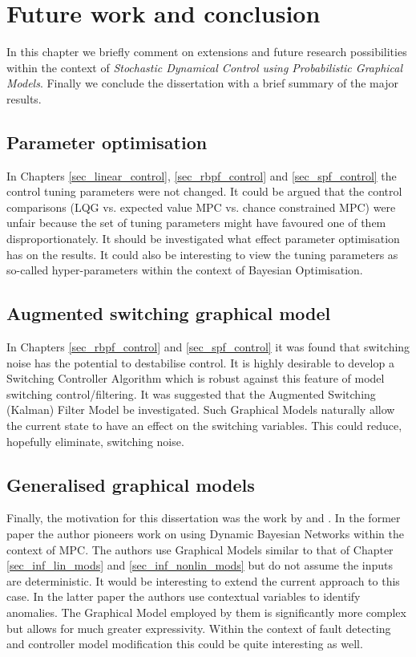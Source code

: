 \chapter{Future work and conclusion}
In this chapter we briefly comment on extensions and future research possibilities within the context of \textit{Stochastic Dynamical Control using Probabilistic Graphical Models}. Finally we conclude the dissertation with a brief summary of the major results.

\section{Parameter optimisation}
In Chapters \ref{sec_linear_control}, \ref{sec_rbpf_control} and \ref{sec_spf_control} the control tuning parameters were not changed. It could be argued that the control comparisons (LQG vs. expected value MPC vs. chance constrained MPC) were unfair because the set of tuning parameters might have favoured one of them disproportionately. It should be investigated what effect parameter optimisation has on the results. It could also be interesting to view the tuning parameters as so-called hyper-parameters within the context of Bayesian Optimisation. 

\section{Augmented switching graphical model}
In Chapters \ref{sec_rbpf_control} and \ref{sec_spf_control} it was found that switching noise has the potential to destabilise control. It is highly desirable to develop a Switching Controller Algorithm which is robust against this feature of model switching control/filtering. It was suggested that the Augmented Switching (Kalman) Filter Model be investigated. Such Graphical Models naturally allow the current state to have an effect on the switching variables. This could reduce, hopefully eliminate, switching noise. 

\section{Generalised graphical models}
Finally, the motivation for this dissertation was the work by \cite{devilliers} and \cite{dabrowski}. In the former paper the author pioneers work on using Dynamic Bayesian Networks within the context of MPC. The authors use Graphical Models similar to that of Chapter \ref{sec_inf_lin_mods} and \ref{sec_inf_nonlin_mods} but do not assume the inputs are deterministic. It would be interesting to extend the current approach to this case. In the latter paper the authors use contextual variables to identify anomalies. The Graphical Model employed by them is significantly more complex but allows for much greater expressivity. Within the context of fault detecting and controller model modification this could be quite interesting as well.

